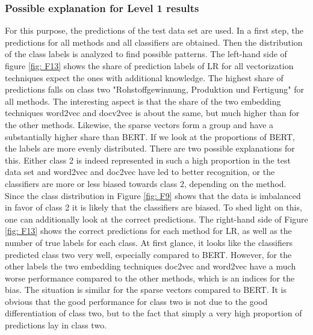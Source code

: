 \documentclass[12pt, a4paper, titlepage]{article}
\begin{document}
\subsubsection*{Possible explanation for Level 1 results}
For this purpose, the predictions of the test data set are used. In a first step, the predictions for all methods and all classifiers are obtained. Then the distribution of the class labels is analyzed to find possible patterns. The left-hand side of figure \ref{fig: F13} shows the share of prediction labels of \ac{LR} for all vectorization techniques expect the ones with additional knowledge. The highest share of predictions falls on class two "Rohstoffgewinnung, Produktion und Fertigung" for all methods. The interesting aspect is that the share of the two embedding techniques word2vec and docv2vec is about the same, but much higher than for the other methods. Likewise, the sparse vectors form a group and have a substantially higher share than \ac{BERT}. If we look at the proportions of \ac{BERT}, the labels are more evenly distributed. There are two possible explanations for this. Either class 2 is indeed represented in such a high proportion in the test data set and word2vec and doc2vec have led to better recognition, or the classifiers are more or less biased towards class 2, depending on the method. Since the class distribution in Figure \ref{fig: F9} shows that the data is imbalanced in favor of class 2 it is likely that the classifiers are biased. To shed light on this, one can additionally look at the correct predictions. The right-hand side of Figure \ref{fig: F13} shows the correct predictions for each method for \ac{LR}, as well as the number of true labels for each class. At first glance, it looks like the classifiers predicted class two very well, especially compared to \ac{BERT}. However, for the other labels the two embedding techniques doc2vec and word2vec have a much worse performance compared to the other methods, which is an indices for the bias. The situation is similar for the sparse vectors compared to BERT. It is obvious that the good performance for class two is not due to the good differentiation of class two, but to the fact that simply a very high proportion of predictions lay in class two. 
\end{document}
